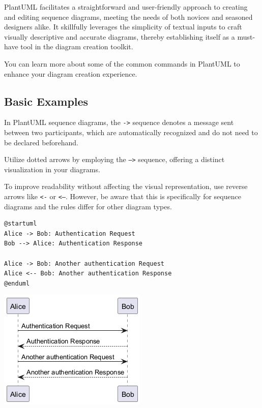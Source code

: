 PlantUML facilitates a straightforward and user-friendly approach to creating and editing sequence diagrams, meeting the needs of both novices and seasoned designers alike. It skillfully leverages the simplicity of textual inputs to craft visually descriptive and accurate diagrams, thereby establishing itself as a must-have tool in the diagram creation toolkit.


You can learn more about some of the common commands in PlantUML to enhance your diagram creation experience.
%
%
\subsection{Basic Examples}


In PlantUML sequence diagrams, the \texttt{->} sequence denotes a message sent between two participants, which are automatically recognized and do not need to be declared beforehand.


Utilize dotted arrows by employing the \texttt{-->} sequence, offering a distinct visualization in your diagrams.


To improve readability without affecting the visual representation, use reverse arrows like \texttt{<-} or \texttt{<--}. However, be aware that this is specifically for sequence diagrams and the rules differ for other diagram types.




\begin{verbatim}
@startuml
Alice -> Bob: Authentication Request
Bob --> Alice: Authentication Response

Alice -> Bob: Another authentication Request
Alice <-- Bob: Another authentication Response
@enduml
\end{verbatim}
\begin{center}
\includegraphics[scale=0.60]{imgw/img-63d99af67915f6505d4c3222c3e0b010.png}
\end{center}
%
%
